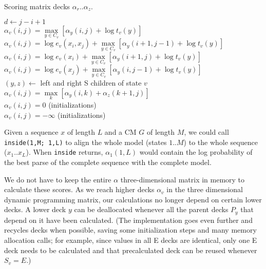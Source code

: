 \documentclass[11pt]{article}
\begin{document}
\begin{algorithm}
         {Scoring matrix decks $\alpha_r..\alpha_z$.}
\begin{algtab*}
       $d \leftarrow j-i+1$\\
       	$\alpha_v(i,j) = \max\limits_{y \in C_v} \left[ \alpha_y(i,j)  + \log t_v(y) \right]$\\
	$\alpha_v(i,j) = \log e_v(x_i, x_j) + \max\limits_{y \in C_v} \left[ \alpha_y(i+1,j-1) + \log t_v(y) \right]$\\
        $\alpha_v(i,j) = \log e_v(x_i) + \max\limits_{y \in C_v} \left[ \alpha_y(i+1,j)   + \log t_v(y) \right]$\\
        $\alpha_v(i,j) = \log e_v(x_j) +      \max\limits_{y \in C_v} \left[ \alpha_y(i,j-1)   + \log t_v(y) \right]$ \\
        $(y,z) \leftarrow $ left and right S children of state $v$\\
        $\alpha_v(i,j) = \max\limits_k \left[ \alpha_y(i,k) + \alpha_z(k+1,j) \right]$ \\
	$\alpha_v(i,j) = 0$  (initializations)\\
       \algelse
	$\alpha_v(i,j) = -\infty$ (initializations)\\
\end{algtab*}
\end{algorithm}

Given a sequence $x$ of length $L$ and a CM $G$ of length $M$, we
could call \texttt{inside(1,M; 1,L)} to align the whole model (states
$1..M$) to the whole sequence ($x_1..x_L$). When \texttt{inside}
returns, $\alpha_1(1,L)$ would contain the log probability of the best
parse of the complete sequence with the complete model. 

We do not have to keep the entire $\alpha$ three-dimensional matrix in
memory to calculate these scores.  As we reach higher decks $\alpha_v$
in the three dimensional dynamic programming matrix, our calculations
no longer depend on certain lower decks. A lower deck $y$ can be
deallocated whenever all the parent decks $P_y$ that depend on it
have been calculated. (The implementation goes even further
and recycles decks when possible, saving some initialization steps and
many memory allocation calls; for example, since values in all E decks
are identical, only one E deck needs to be calculated and that
precalculated deck can be reused whenever $S_v = E$.)
\end{document}
